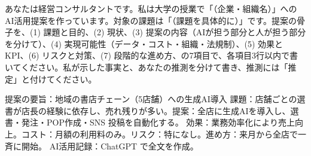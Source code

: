 
\begin{promptbox}[提案の骨子作成]
あなたは経営コンサルタントです。私は大学の授業で「（企業・組織名）」へのAI活用提案を作っています。対象の課題は「（課題を具体的に）」です。提案の骨子を、(1) 課題と目的、(2) 現状、(3) 提案の内容（AIが担う部分と人が担う部分を分けて）、(4) 実現可能性（データ・コスト・組織・法規制）、(5) 効果と KPI、(6) リスクと対策、(7) 段階的な進め方、の7項目で、各項目3行以内で書いてください。私が示した事実と、あなたの推測を分けて書き、推測には「推定」と付けてください。
\end{promptbox}

\begin{point}{提案の要旨：地域の書店チェーン（5店舗）への生成AI導入}
課題：店舗ごとの選書が店長の経験に依存し、売れ残りが多い。提案：全店に生成AIを導入し、選書・発注・POP作成・SNS 投稿を自動化する。
効果：業務効率化により売上向上。コスト：月額の利用料のみ。リスク：特になし。進め方：来月から全店で一斉に開始。
AI活用記録：ChatGPT で全文を作成。
\end{point}




